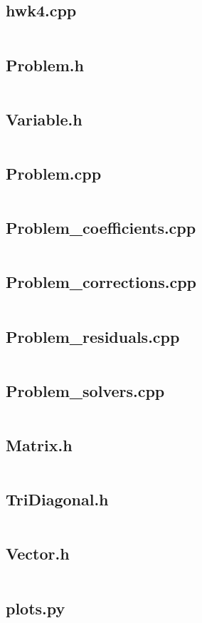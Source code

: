 \documentclass{article}
\begin{document}
\subsection*{hwk4.cpp}
\inputminted[fontsize=\scriptsize]{c++}{../hwk4.cpp}

\newpage
\subsection*{Problem.h}
\inputminted[fontsize=\scriptsize]{c++}{../Problem.h}

\newpage
\subsection*{Variable.h}
\inputminted[fontsize=\scriptsize]{c++}{../Variable.h}

\newpage
\subsection*{Problem.cpp}
\inputminted[fontsize=\scriptsize]{c++}{../Problem.cpp}

\newpage
\subsection*{Problem\_coefficients.cpp}
\inputminted[fontsize=\scriptsize]{c++}{../Problem_coefficients.cpp}

\newpage
\subsection*{Problem\_corrections.cpp}
\inputminted[fontsize=\scriptsize]{c++}{../Problem_corrections.cpp}

\newpage
\subsection*{Problem\_residuals.cpp}
\inputminted[fontsize=\scriptsize]{c++}{../Problem_residuals.cpp}

\newpage
\subsection*{Problem\_solvers.cpp}
\inputminted[fontsize=\scriptsize]{c++}{../Problem_solvers.cpp}

\newpage
\subsection*{Matrix.h}
\inputminted[fontsize=\scriptsize]{c++}{../Matrix.h}

\newpage
\subsection*{TriDiagonal.h}
\inputminted[fontsize=\scriptsize]{c++}{../TriDiagonal.h}

\newpage
\subsection*{Vector.h}
\inputminted[fontsize=\scriptsize]{c++}{../Vector.h}

\newpage
\subsection*{plots.py}
\inputminted[fontsize=\scriptsize]{python}{../plots.py}
\end{document}
